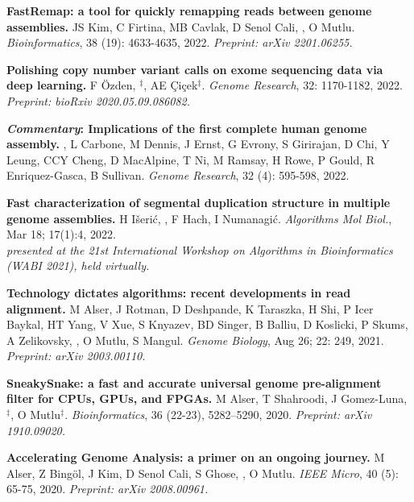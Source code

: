 \vspace{-.2cm}
    {\bf FastRemap: a tool for quickly remapping reads between genome assemblies.}
    JS Kim, C Firtina, MB Cavlak, D Senol Cali, \calkan{}, O Mutlu.
    {\it Bioinformatics}, 38 (19): 4633-4635, 2022. \textit {Preprint: arXiv 2201.06255.}

\vspace{-.2cm}
    {\bf Polishing copy number variant calls on exome sequencing data via deep learning.}
    F Özden, \calkan{}$^\ddag$, AE Çiçek$^\ddag$. {\it Genome Research}, 32: 1170-1182, 2022. \textit {Preprint: bioRxiv 2020.05.09.086082.}

\vspace{-.2cm}
    {\bf \textit{Commentary}: Implications of the first complete human genome assembly.} \calkan{}, L Carbone, M Dennis, J Ernst, G Evrony, S Girirajan, D Chi, Y Leung, CCY Cheng, D MacAlpine, T Ni, M Ramsay, H Rowe, P Gould, R Enriquez-Gasca, B Sullivan. {\it Genome Research}, 32 (4): 595-598, 2022.

\vspace{-.2cm}
    {\bf Fast characterization of segmental duplication structure in multiple genome assemblies.}
    H Išerić, \calkan{}, F Hach, I Numanagić.
    {\it Algorithms Mol Biol.}, Mar 18; 17(1):4, 2022.\\
    \hspace*{1cm}
    {\footnotesize \em presented at the 21st International Workshop on Algorithms in Bioinformatics (WABI 2021), held virtually.}

\clearpage

\vspace{-.2cm}
    {\bf Technology dictates algorithms: recent developments in read alignment.}
    M Alser, J Rotman, D Deshpande, K Taraszka, H Shi, P Icer Baykal, HT Yang, V Xue, S Knyazev, BD Singer, B Balliu, D Koslicki, P Skums, A Zelikovsky, \calkan{}, O Mutlu, S Mangul.
    {\it Genome Biology}, Aug 26; 22: 249, 2021.
    \textit{Preprint: arXiv 2003.00110.}

\vspace{-.2cm}
    {\bf SneakySnake: a fast and accurate universal genome pre-alignment filter for CPUs, GPUs, and FPGAs.} M Alser, T Shahroodi, J Gomez-Luna, \calkan{}$^\ddag$, O Mutlu$^\ddag$. {\it Bioinformatics}, 36 (22-23), 5282–5290, 2020. \textit {Preprint: arXiv 1910.09020.}

\vspace{-.2cm}
    {\bf Accelerating Genome Analysis: a primer on an ongoing journey.} M Alser, Z Bingöl, J Kim, D Senol Cali, S Ghose, \calkan{}, O Mutlu. {\it IEEE Micro}, 40 (5): 65-75, 2020. \textit{Preprint: arXiv 2008.00961.}

